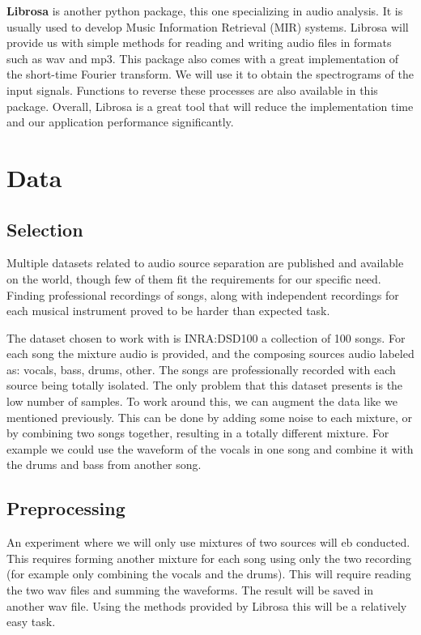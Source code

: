 \documentclass[../Thesis.tex]{subfiles}
\begin{document}
\textbf{Librosa} is another python package, this one specializing in audio analysis. It is usually used to develop Music Information Retrieval (MIR) systems. Librosa will provide us with simple methods for reading and writing audio files in formats such as wav and mp3. This package also comes with a great implementation of the short-time Fourier transform. We will use it to obtain the spectrograms of the input signals. Functions to reverse these processes are also available in this package.  Overall, Librosa is a great tool that will reduce the implementation time and our application performance significantly.


\section  {Data}
\subsection {Selection}

Multiple datasets related to audio source separation are published and available on the world, though few of them fit the requirements for our specific need. Finding professional recordings of songs, along with independent recordings for each musical instrument proved to be harder than expected task. 

The dataset chosen to work with is INRA:DSD100 a collection of 100 songs. For each song the mixture audio is provided, and the composing sources audio labeled as: vocals, bass, drums, other. The songs are professionally recorded with each source being totally isolated. The only problem that this dataset presents is the low number of samples. To work around this, we can augment the data like we mentioned previously. This can be done by adding some noise to each mixture, or by combining two songs together, resulting in a totally different mixture. For example we could use the waveform of the vocals in one song and combine it with the drums and bass from another song.


\subsection {Preprocessing}

An experiment where we will only use mixtures of two sources will eb conducted. This requires forming another mixture for each song using only the two recording (for example only combining the vocals and the drums). This will require reading the two wav files and summing the waveforms. The result will be saved in another wav file. Using the methods provided by Librosa this will be a relatively easy task.
\end{document}
